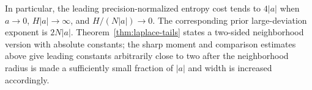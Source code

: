In particular, the leading precision-normalized entropy cost tends to $4|a|$ when $a\to0$, $H|a|\to\infty$, and $H/(N|a|)\to0$. The corresponding prior large-deviation exponent is $2N|a|$. Theorem~\ref{thm:laplace-tails} states a two-sided neighborhood version with absolute constants; the sharp moment and comparison estimates above give leading constants arbitrarily close to two after the neighborhood radius is made a sufficiently small fraction of $|a|$ and width is increased accordingly.
